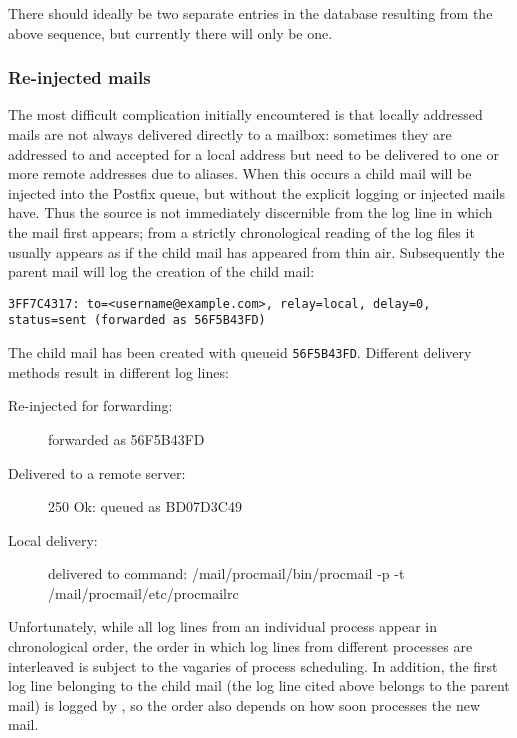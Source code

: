 There should ideally be two separate entries in the database resulting from
the above sequence, but currently there will only be one.



\subsubsection{Re-injected mails}

The most difficult complication initially encountered is that locally
addressed mails are not always delivered directly to a mailbox: sometimes
they are addressed to and accepted for a local address but need to be
delivered to one or more remote addresses due to aliases.  When this occurs
a child mail will be injected into the Postfix queue, but without the
explicit logging  or  injected mails have.
Thus the source is not immediately discernible from the log line in which
the mail first appears; from a strictly chronological reading of the log
files it usually appears as if the child mail has appeared from thin air.
Subsequently the parent mail will log the creation of the child mail:

\texttt{3FF7C4317: to=<username@example.com>, relay=local, \newline
delay=0, status=sent (forwarded as 56F5B43FD)}

The child mail has been created with queueid \texttt{56F5B43FD}.  Different
delivery methods result in different log lines:

\begin{description}

    \item [Re-injected for forwarding:] forwarded as 56F5B43FD

    \item [Delivered to a remote \SMTP{} server:] 250 Ok: queued as
        BD07D3C49

    \item [Local delivery:] delivered to command:
        /mail/procmail/bin/procmail -p -t /mail/procmail/etc/procmailrc

\end{description}

Unfortunately, while all log lines from an individual process appear in
chronological order, the order in which log lines from different processes
are interleaved is subject to the vagaries of process scheduling.  In
addition, the first log line belonging to the child mail (the log line
cited above belongs to the parent mail) is logged by , so the
order also depends on how soon  processes the new mail.

